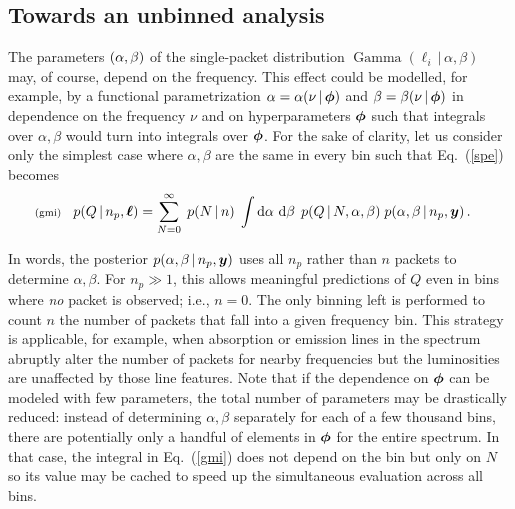 \documentclass[11pt]{article}
\newcommand{\lleq}[1]{\label{#1} }
\renewcommand{\lleq}[1]{\label{#1} {\scriptstyle {\rm (#1)}} \hspace*{2ex} }
\newcommand{\cond}{\,|\,}
\newcommand{\refeq}[1]{Eq.~(\ref{#1})}
\DeclareMathOperator{\GammaDist}{Gamma}
\newcommand{\npack}{{n_p}}
\newcommand{\Lumtot}{Q}
\newcommand{\rmdx}[1]{\dd{#1}} %
\begin{document}
\subsection{Towards an unbinned analysis} \label{sec:unbinned}

The parameters $\qty(\alpha, \beta)$ of the single-packet distribution
$\GammaDist(\ell_i \cond \alpha, \beta)$ may, of course, depend on the
frequency. %
This effect could be modelled, for example, by a functional
parametrization $\alpha = \alpha(\nu \cond \bmphi)$ and
$\beta = \beta(\nu \cond \bmphi)$ in dependence on the frequency $\nu$
and on hyperparameters ${\bm{\phi}}$ such that integrals over
$\alpha, \beta$ would turn into integrals over ${\bm{\phi}}$. For the sake
of clarity, let us consider only the simplest case where
$\alpha, \beta$ are the same in every bin such that \refeq{spe}
becomes
\begin{align}
  \lleq{gmi}
  p(Q\cond \npack,\bml)
  &=     \sum_{N=0}^\infty \;
  p(N\cond n)\;
  \int \rmdx{\alpha}\,\rmdx{\beta}\;
  p(\Lumtot \cond N, \alpha, \beta)\;
  p(\alpha, \beta \cond \npack, \bmy) \, .
\end{align}


In words, the posterior $ p(\alpha, \beta \cond \npack, \bmy)$ uses
all $\npack$ rather than $n$ packets to determine $\alpha, \beta$. For
$\npack \gg 1$, this allows meaningful predictions of $\Lumtot$ even
in bins where \emph{no} packet is observed; i.e., $n=0$. The only
binning left is performed to count $n$ the number of packets that fall
into a given frequency bin. This strategy is applicable, for example,
when absorption or emission lines in the spectrum abruptly alter the
number of packets for nearby frequencies but the luminosities are
unaffected by those line features. Note that if the dependence on
${\bm{\phi}}$ can be modeled with few parameters, the total number of
parameters may be drastically reduced: instead of determining
$\alpha, \beta$ separately for each of a few thousand bins, there are
potentially only a handful of elements in ${\bm{\phi}}$ for the entire
spectrum. In that case, the integral in \refeq{gmi} does not depend on
the bin but only on $N$ so its value may be cached to speed up the
simultaneous evaluation across all bins.
\end{document}
